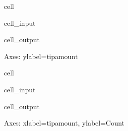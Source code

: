 \documentclass[letterpaper,10pt,english]{sphinxmanual}
\begin{document}
\begin{sphinxuseclass}{cell}
\begin{sphinxuseclass}{cell_input}
\begin{sphinxVerbatim}[commandchars=\\\{\}]
\PYG{p}{[}\PYG{p}{]} 
\end{sphinxVerbatim}

\end{sphinxuseclass}
\begin{sphinxuseclass}{cell_output}
\begin{sphinxVerbatim}[commandchars=\\\{\}]
\PYGZlt{}Axes: ylabel=\PYGZsq{}tip\PYGZus{}amount\PYGZsq{}\PYGZgt{}
\end{sphinxVerbatim}

\noindent{}

\end{sphinxuseclass}
\end{sphinxuseclass}
\begin{sphinxuseclass}{cell}
\begin{sphinxuseclass}{cell_input}
\begin{sphinxVerbatim}[commandchars=\\\{\}]
\PYG{p}{[}\PYG{p}{]} 
\end{sphinxVerbatim}

\end{sphinxuseclass}
\begin{sphinxuseclass}{cell_output}
\begin{sphinxVerbatim}[commandchars=\\\{\}]
\PYGZlt{}Axes: xlabel=\PYGZsq{}tip\PYGZus{}amount\PYGZsq{}, ylabel=\PYGZsq{}Count\PYGZsq{}\PYGZgt{}
\end{sphinxVerbatim}

\noindent{}

\end{sphinxuseclass}
\end{sphinxuseclass}
\sphinxAtStartPar
{}
\end{document}
